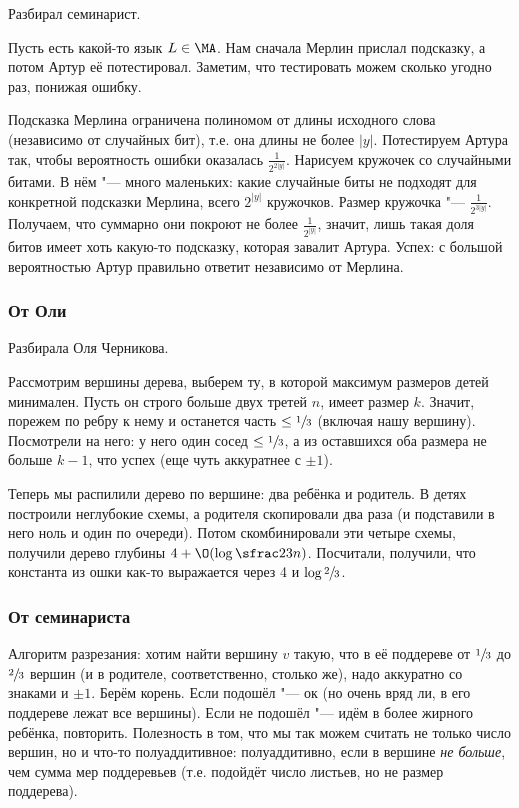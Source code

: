 	Разбирал семинарист.

	Пусть есть какой-то язык $L \in \MA$.
	Нам сначала Мерлин прислал подсказку, а потом Артур её потестировал.
	Заметим, что тестировать можем сколько угодно раз, понижая ошибку.

	Подсказка Мерлина ограничена полиномом от длины исходного слова (независимо от случайных бит),
	т.е. она длины не более $|y|$.
	Потестируем Артура так, чтобы вероятность ошибки оказалась $\frac{1}{2^{2|y|}}$.
	Нарисуем кружочек со случайными битами.
	В нём "--- много маленьких: какие случайные биты не подходят для конкретной подсказки Мерлина,
	всего $2^{|y|}$ кружочков.
	Размер кружочка "--- $\frac{1}{2^{3|y|}}$.
	Получаем, что суммарно они покроют не более $\frac{1}{2^{|y|}}$, значит, лишь такая
	доля битов имеет хоть какую-то подсказку, которая завалит Артура.
	Успех: с большой вероятностью Артур правильно ответит независимо от Мерлина.

	\subsubsection{От Оли}
		Разбирала Оля Черникова.

		Рассмотрим вершины дерева, выберем ту, в которой максимум размеров детей минимален.
		Пусть он строго больше двух третей $n$, имеет размер $k$.
		Значит, порежем по ребру к нему и останется часть $\le \sfrac 1 3$ (включая нашу вершину).
		Посмотрели на него: у него один сосед $\le \sfrac 13$, а из оставшихся
		оба размера не больше $k-1$, что успех (еще чуть аккуратнее с $\pm 1$).

		Теперь мы распилили дерево по вершине: два ребёнка и родитель.
		В детях построили неглубокие схемы, а родителя скопировали два раза (и подставили в него ноль и один по очереди).
		Потом скомбинировали эти четыре схемы, получили дерево глубины $4 + \O(\log \sfrac23 n)$.
		Посчитали, получили, что константа из ошки как-то выражается через 4 и $\log \sfrac 23$.

	\subsubsection{От семинариста}
		Алгоритм разрезания: хотим найти вершину $v$ такую, что в её поддереве от $\sfrac 1 3$ до $\sfrac 23$
		вершин (и в родителе, соответственно, столько же), надо аккуратно со знаками и $\pm 1$.
		Берём корень.
		Если подошёл "--- ок (но очень вряд ли, в его поддереве лежат все вершины).
		Если не подошёл "--- идём в более жирного ребёнка, повторить.
		Полезность в том, что мы так можем считать не только число вершин, но и что-то
		полуаддитивное: полуаддитивно, если в вершине \textit{не больше}, чем сумма мер поддеревьев
		(т.е. подойдёт число листьев, но не размер поддерева).
